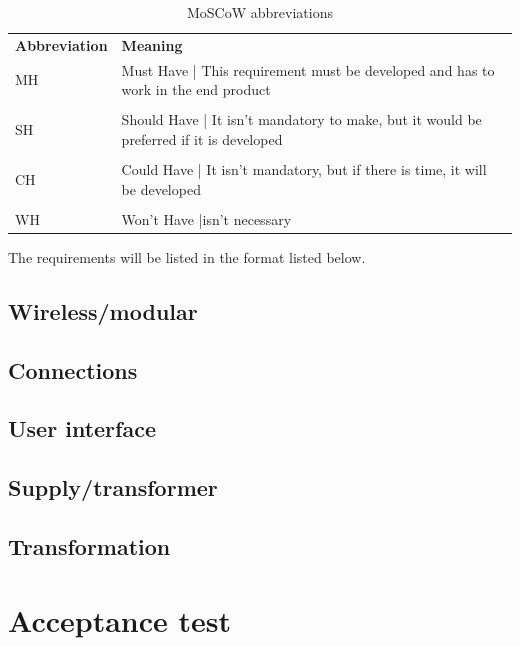 \begin{table}[H]
\centering
    \begin{tabular}{l p{8cm}}
        \textbf{Abbreviation} & \textbf{Meaning} \\
        MH & Must Have | This requirement must be developed and has to work in the end product\\
        & \\
        SH & Should Have | It isn't mandatory to make, but it would be preferred if it is developed\\
        & \\
        CH & Could Have | It isn't mandatory, but if there is time, it will be developed\\
        & \\
        WH & Won't Have |isn't necessary\\
    \end{tabular}
    \caption{MoSCoW abbreviations}
    \label{tab:moscow_abbreviations}
\end{table}

The requirements will be listed in the format listed below.\\



\subsection{Wireless/modular}


\subsection{Connections}


\subsection{User interface}


\subsection{Supply/transformer}


\subsection{Transformation}




\section{Acceptance test}


